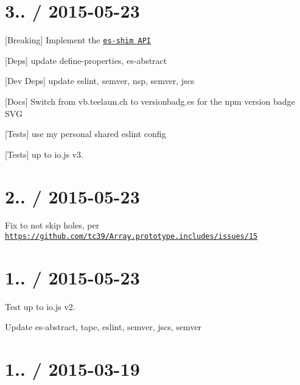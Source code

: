 \section*{3.. / 2015-\/05-\/23 }


\begin{DoxyItemize}
\item \mbox{[}Breaking\mbox{]} Implement the \href{es-shims/api}{\tt es-\/shim A\+PI}
\item \mbox{[}Deps\mbox{]} update {\ttfamily define-\/properties}, {\ttfamily es-\/abstract}
\item \mbox{[}Dev Deps\mbox{]} update {\ttfamily eslint}, {\ttfamily semver}, {\ttfamily nsp}, {\ttfamily semver}, {\ttfamily jscs}
\item \mbox{[}Docs\mbox{]} Switch from vb.\+teelaun.\+ch to versionbadg.\+es for the npm version badge S\+VG
\item \mbox{[}Tests\mbox{]} use my personal shared {\ttfamily eslint} config
\item \mbox{[}Tests\mbox{]} up to {\ttfamily io.\+js} {\ttfamily v3.}
\end{DoxyItemize}

\section*{2.. / 2015-\/05-\/23 }


\begin{DoxyItemize}
\item Fix to not skip holes, per \href{https://github.com/tc39/Array.prototype.includes/issues/15}{\tt https\+://github.\+com/tc39/\+Array.\+prototype.\+includes/issues/15}
\end{DoxyItemize}

\section*{1.. / 2015-\/05-\/23 }


\begin{DoxyItemize}
\item Test up to {\ttfamily io.\+js} {\ttfamily v2.}
\item Update {\ttfamily es-\/abstract}, {\ttfamily tape}, {\ttfamily eslint}, {\ttfamily semver}, {\ttfamily jscs}, {\ttfamily semver}
\end{DoxyItemize}

\section*{1.. / 2015-\/03-\/19 }


